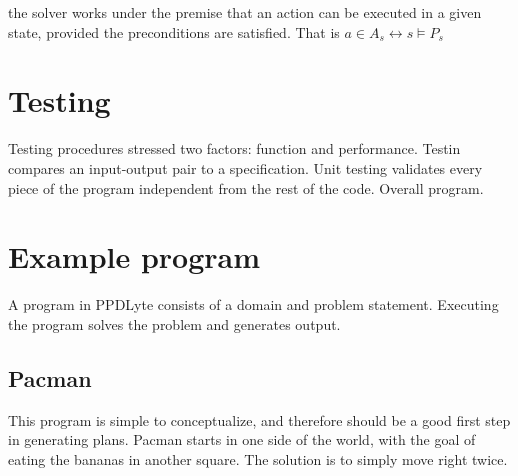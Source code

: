\documentclass[
a4paper, %
11pt, %
onecolumn, %
openany, %
]{memoir}
\begin{document}
the solver works under the premise that an action can be executed in a given state, provided the preconditions are satisfied. That is $a \in A_{s} \leftrightarrow s \models P_{s}$

\section{Testing}
Testing procedures stressed two factors: function and performance. Testin compares an input-output pair to a specification. Unit testing validates every piece of the program independent from the rest of the code. Overall program. 

\section{Example program}
A program in PPDLyte consists of a domain and problem statement. Executing the program solves the problem and generates output.

\subsection{Pacman}
This program is simple to conceptualize, and therefore should be a good first step in generating plans. Pacman starts in one side of the world, with the goal of eating the bananas in another square. The solution is to simply move right twice.\\
\end{document}
